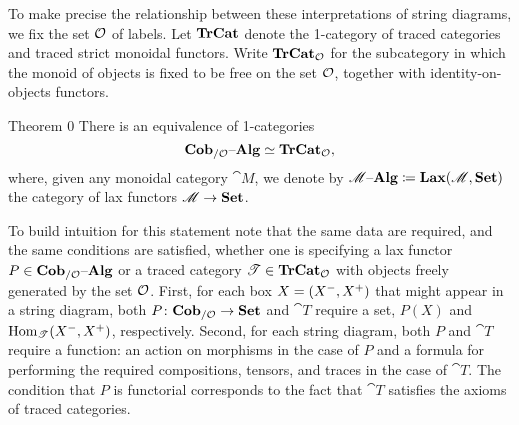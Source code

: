\documentclass[11pt,oneside,article]{memoir}
\begin{document}
To make precise the relationship between these interpretations of string diagrams, we fix the set
$\mathcal{O}$ of labels. Let $\mathbf{TrCat}$ denote the 1-category of traced categories and traced strict
monoidal functors. Write $\mathbf{TrCat}_{\mathcal{O}}$ for the subcategory in which the monoid of objects is
fixed to be free on the set $\mathcal{O}$, together with identity-on-objects functors.

\begin{named}{Theorem 0}
    \label{th:traced is cob alg}
  There is an equivalence of 1-categories
  \begin{equation}
      \label{eq:single_fiber_tr}
    \mathbf{Cob}_{/\mathcal{O}}{\text \textendash}\mathbf{Alg}\simeq\mathbf{TrCat}_{\mathcal{O}},
  \end{equation}
  where, given any monoidal category $\cat{M}$, we denote by
  $\mathscr{M}{\text \textendash}\mathbf{Alg}\coloneqq\mathbf{Lax}(\mathscr{M},\mathbf{Set})$ the category of lax functors $\mathscr{M}\to\mathbf{Set}$.
\end{named}

To build intuition for this statement note that the same data are required, and the same conditions
are satisfied, whether one is specifying a lax functor $P\in\mathbf{Cob}_{/\mathcal{O}}{\text \textendash}\mathbf{Alg}$ or a traced category
$\mathscr{T}\in\mathbf{TrCat}_{\mathcal{O}}$ with objects freely generated by the set $\mathcal{O}$. First, for each box
$X=(X^-,X^+)$ that might appear in a string diagram, both $P\colon\mathbf{Cob}_{/\mathcal{O}}\to\mathbf{Set}$
and $\cat{T}$ require a set, $P(X)$ and $\operatorname{Hom}_{\mathscr{T}}(X^-,X^+)$, respectively. Second,
for each string diagram, both $P$ and $\cat{T}$ require a function: an action on morphisms in the
case of $P$ and a formula for performing the required compositions, tensors, and traces in the case
of $\cat{T}$. The condition that $P$ is functorial corresponds to the fact that $\cat{T}$ satisfies
the axioms of traced categories.
\end{document}
